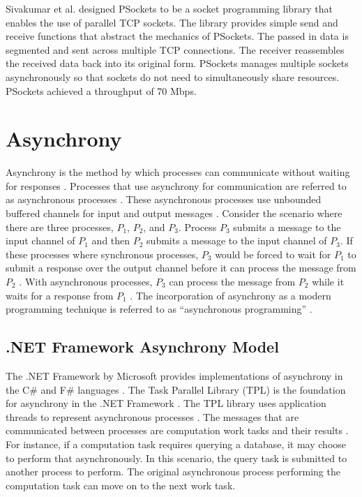 Sivakumar et al. designed PSockets \cite{Sivakumar2000psockets} to be a socket programming library that enables the use of parallel TCP sockets. The library provides simple send and receive functions that abstract the mechanics of PSockets. The passed in data is segmented and sent across multiple TCP connections. The receiver reassembles the received data back into its original form. PSockets manages multiple sockets asynchronously so that sockets do not need to simultaneously share resources. PSockets achieved a throughput of 70 Mbps.

\section{Asynchrony}

Asynchrony is the method by which processes can communicate without waiting for responses \cite{He1990}. Processes that use asynchrony for communication are referred to as asynchronous processes \cite{He1990,Josephs1989}. These asynchronous processes use unbounded buffered channels for input and output messages \cite{He1990,Josephs1989}. Consider the scenario where there are three processes, $P_1$, $P_2$, and $P_3$. Process $P_3$ submits a message to the input channel of $P_1$ and then $P_2$ submits a message to the input channel of $P_3$. If these processes where synchronous processes, $P_3$ would be forced to wait for $P_1$ to submit a response over the output channel before it can process the message from $P_2$ \cite{He1990}. With asynchronous processes, $P_3$ can process the message from $P_2$ while it waits for a response from $P_1$ \cite{He1990}. The incorporation of asynchrony as a modern programming technique is referred to as ``asynchronous programming'' \cite{syme2011f}.

\subsection{.NET Framework Asynchrony Model}

The .NET Framework by Microsoft provides implementations of asynchrony in the C\# and F\# languages \cite{Leijen2009,syme2011f}. The Task Parallel Library (TPL) is the foundation for asynchrony in the .NET Framework \cite{Leijen2009,msftVFS}. The TPL library uses application threads to represent asynchronous processes \cite{Leijen2009}. The messages that are communicated between processes are computation work tasks and their results \cite{Leijen2009}. For instance, if a computation task requires querying a database, it may choose to perform that asynchronously. In this scenario, the query task is submitted to another process to perform. The original asynchronous process performing the computation task can move on to the next work task.

